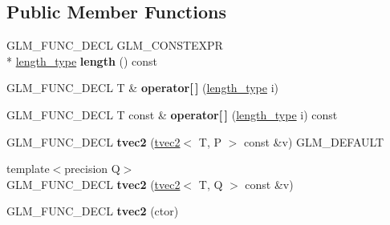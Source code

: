 \subsection*{Public Member Functions}
\begin{DoxyCompactItemize}
\item 
\hypertarget{structglm_1_1tvec2_abac356c9230a233a4b2703bb42a9ff43}{G\-L\-M\-\_\-\-F\-U\-N\-C\-\_\-\-D\-E\-C\-L G\-L\-M\-\_\-\-C\-O\-N\-S\-T\-E\-X\-P\-R \\*
\hyperlink{structglm_1_1tvec2_a5a5ddebab821a3cf9185772386afbe8d}{length\-\_\-type} {\bfseries length} () const }\label{structglm_1_1tvec2_abac356c9230a233a4b2703bb42a9ff43}

\item 
\hypertarget{structglm_1_1tvec2_a70383ca2702ecf4d4ff41063de68594d}{G\-L\-M\-\_\-\-F\-U\-N\-C\-\_\-\-D\-E\-C\-L T \& {\bfseries operator\mbox{[}$\,$\mbox{]}} (\hyperlink{structglm_1_1tvec2_a5a5ddebab821a3cf9185772386afbe8d}{length\-\_\-type} i)}\label{structglm_1_1tvec2_a70383ca2702ecf4d4ff41063de68594d}

\item 
\hypertarget{structglm_1_1tvec2_af1b26940fc1906b98d7e4c6c52b89c7f}{G\-L\-M\-\_\-\-F\-U\-N\-C\-\_\-\-D\-E\-C\-L T const \& {\bfseries operator\mbox{[}$\,$\mbox{]}} (\hyperlink{structglm_1_1tvec2_a5a5ddebab821a3cf9185772386afbe8d}{length\-\_\-type} i) const }\label{structglm_1_1tvec2_af1b26940fc1906b98d7e4c6c52b89c7f}

\item 
\hypertarget{structglm_1_1tvec2_a9e8031b0fb8ed86586354fc97e260b2f}{G\-L\-M\-\_\-\-F\-U\-N\-C\-\_\-\-D\-E\-C\-L {\bfseries tvec2} (\hyperlink{structglm_1_1tvec2}{tvec2}$<$ T, P $>$ const \&v) G\-L\-M\-\_\-\-D\-E\-F\-A\-U\-L\-T}\label{structglm_1_1tvec2_a9e8031b0fb8ed86586354fc97e260b2f}

\item 
\hypertarget{structglm_1_1tvec2_ade6d19296f50987189652f86decc793a}{{\footnotesize template$<$precision Q$>$ }\\G\-L\-M\-\_\-\-F\-U\-N\-C\-\_\-\-D\-E\-C\-L {\bfseries tvec2} (\hyperlink{structglm_1_1tvec2}{tvec2}$<$ T, Q $>$ const \&v)}\label{structglm_1_1tvec2_ade6d19296f50987189652f86decc793a}

\item 
\hypertarget{structglm_1_1tvec2_a2d33be2132cdf904dbfa27a5a1fa4b35}{G\-L\-M\-\_\-\-F\-U\-N\-C\-\_\-\-D\-E\-C\-L {\bfseries tvec2} (ctor)}\label{structglm_1_1tvec2_a2d33be2132cdf904dbfa27a5a1fa4b35}


\end{DoxyCompactItemize}
